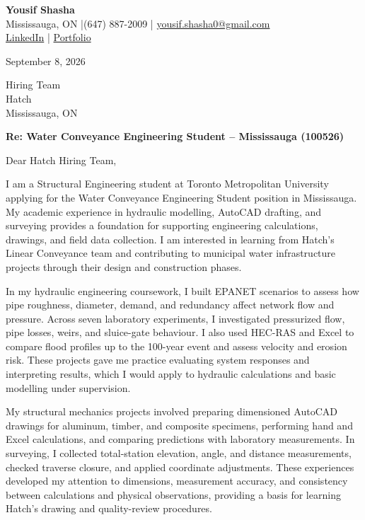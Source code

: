 \documentclass[11pt]{article}
\newcommand{\contact}[1]{{\small #1}}
\begin{document}
\begin{center}
{\LARGE \textbf{Yousif Shasha}}\\[4pt]
\contact{Mississauga, ON \enspace|\enspace (647) 887-2009 \enspace|\enspace
\href{mailto:yousif.shasha0@gmail.com}{yousif.shasha0@gmail.com}}\\[3pt]
\contact{\href{https://www.linkedin.com/in/yousif-shasha-177412375/}{LinkedIn}
\enspace|\enspace
\href{https://yousifshasha.github.io/Yousif-Shasha.github.io/}{Portfolio}}
\end{center}
\vspace{-4pt}

September 8, 2026

Hiring Team\\
Hatch\\
Mississauga, ON

\textbf{Re: Water Conveyance Engineering Student -- Mississauga (100526)}

Dear Hatch Hiring Team,

I am a Structural Engineering student at Toronto Metropolitan University applying for the Water Conveyance Engineering Student position in Mississauga. My academic experience in hydraulic modelling, AutoCAD drafting, and surveying provides a foundation for supporting engineering calculations, drawings, and field data collection. I am interested in learning from Hatch's Linear Conveyance team and contributing to municipal water infrastructure projects through their design and construction phases.

In my hydraulic engineering coursework, I built EPANET scenarios to assess how pipe roughness, diameter, demand, and redundancy affect network flow and pressure. Across seven laboratory experiments, I investigated pressurized flow, pipe losses, weirs, and sluice-gate behaviour. I also used HEC-RAS and Excel to compare flood profiles up to the 100-year event and assess velocity and erosion risk. These projects gave me practice evaluating system responses and interpreting results, which I would apply to hydraulic calculations and basic modelling under supervision.

My structural mechanics projects involved preparing dimensioned AutoCAD drawings for aluminum, timber, and composite specimens, performing hand and Excel calculations, and comparing predictions with laboratory measurements. In surveying, I collected total-station elevation, angle, and distance measurements, checked traverse closure, and applied coordinate adjustments. These experiences developed my attention to dimensions, measurement accuracy, and consistency between calculations and physical observations, providing a basis for learning Hatch's drawing and quality-review procedures.
\end{document}
